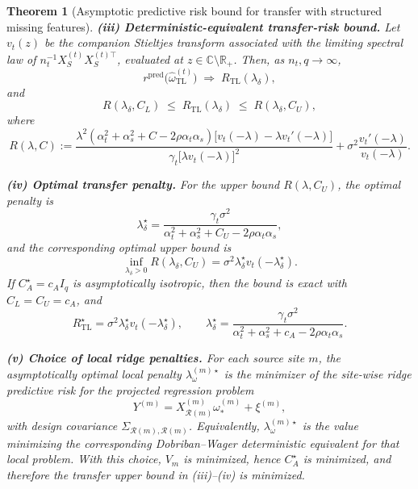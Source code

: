 \documentclass[11pt]{article}
\newcommand{\1}{\mathbf{1}}
\newtheorem{theorem}{Theorem}
\begin{document}
\begin{theorem}[Asymptotic predictive risk bound for transfer with structured missing features]
\medskip
\noindent\textbf{(iii) Deterministic-equivalent transfer-risk bound.}
Let \(v_t(z)\) be the companion Stieltjes transform associated with the limiting spectral law
of \(n_t^{-1}X_S^{(t)}X_S^{(t)\top}\), evaluated at \(z\in\mathbb C\setminus \mathbb R_+\).
Then, as \(n_t,q\to\infty\),
\[
r^{\mathrm{pred}}\!\bigl(\widehat\omega_{\mathrm{TL}}^{(t)}\bigr)
\;\Longrightarrow\;
R_{\mathrm{TL}}(\lambda_\delta),
\]
and
\[
R(\lambda_\delta,C_L)\;\le\;
R_{\mathrm{TL}}(\lambda_\delta)
\;\le\;
R(\lambda_\delta,C_U),
\]
where
\[
R(\lambda,C)
:=
\frac{\lambda^2(\alpha_t^2+\alpha_s^2+C-2\rho\alpha_t\alpha_s)
\bigl[v_t(-\lambda)-\lambda v_t'(-\lambda)\bigr]}
{\gamma_t\bigl[\lambda v_t(-\lambda)\bigr]^2}
+
\sigma^2\frac{v_t'(-\lambda)}{v_t(-\lambda)}.
\]

\medskip
\noindent\textbf{(iv) Optimal transfer penalty.}
For the upper bound \(R(\lambda,C_U)\), the optimal penalty is
\[
\lambda_\delta^\star
=
\frac{\gamma_t\sigma^2}
{\alpha_t^2+\alpha_s^2+C_U-2\rho\alpha_t\alpha_s},
\]
and the corresponding optimal upper bound is
\[
\inf_{\lambda_\delta>0}
R(\lambda_\delta,C_U)
=
\sigma^2 \lambda_\delta^\star v_t(-\lambda_\delta^\star).
\]
If \(C_A^\star=c_A I_q\) is asymptotically isotropic, then the bound is exact with \(C_L=C_U=c_A\), and
\[
R_{\mathrm{TL}}^\star
=
\sigma^2 \lambda_\delta^\star v_t(-\lambda_\delta^\star),
\qquad
\lambda_\delta^\star
=
\frac{\gamma_t\sigma^2}
{\alpha_t^2+\alpha_s^2+c_A-2\rho\alpha_t\alpha_s}.
\]

\medskip
\noindent\textbf{(v) Choice of local ridge penalties.}
For each source site \(m\), the asymptotically optimal local penalty
\(\lambda_\omega^{(m)\star}\) is the minimizer of the site-wise ridge predictive risk
for the projected regression problem
\[
Y^{(m)} = X_{\mathcal R(m)}^{(m)}\omega_*^{(m)} + \xi^{(m)},
\]
with design covariance \(\Sigma_{\mathcal R(m),\mathcal R(m)}\).
Equivalently, \(\lambda_\omega^{(m)\star}\) is the value minimizing the corresponding
Dobriban--Wager deterministic equivalent for that local problem.
With this choice, \(V_m\) is minimized, hence \(C_A^\star\) is minimized, and therefore
the transfer upper bound in (iii)--(iv) is minimized.
\end{theorem}
\end{document}
